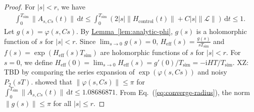 \documentclass[11pt]{article}
\newcommand{\eq}[1]{(\ref{eq:#1})}
\newcommand{\lem}[1]{\hyperref[lem:#1]{Lemma~\ref*{lem:#1}}}
\renewcommand{\i}{\mathrm{i}}
\renewcommand{\d}{\mathrm{d}}
\renewcommand{\L}{\mathcal{L}}
\newcommand{\simu}{\mathrm{sim}}
\newcommand{\Hc}{H_{\mathrm{control}}}
\newcommand{\He}{H_{\mathrm{eff}}}
\newcommand{\xz}[1]{{\color{cyan} XZ: #1}}
\begin{document}
\begin{proof}
    For $|s|< r$, we have \begin{align}
    \label{eq:converge-radius}
        \int_{0}^{T_{\simu}}\|A_{s,Cs}(t) \|\,\d t\le\int_{0}^{T_{\simu}}(2|s|\|\Hc(t)\|+C|s|\|\L\|)\, \d t\le 1.
    \end{align}
    Let $g(s) = \varphi(s, Cs)$. By \lem{analytic-phi}, $g(s)$ is a holomorphic function of $s$ for $|s|< r$. Since $\lim_{s\to 0}g(s)= 0$, 
    $\He(s)=\frac{g(s)}{sT_{\simu}}$ and $f(s) = \exp(\He(s)T_{\simu})$ are holomorphic functions of $s$ for $|s|< r$. For $s=0$, we define $\He(0) = \lim_{s\to 0} \He(s) = g'(0)/T_{\simu}= -\i HT/T_{\simu}$. \xz{TBD by comparing the series expansion of $\exp(\varphi(s, Cs))$ and noisy $P_2(sT)$.}
    \citet{moan1998efficient} showed that $\|\varphi(s,C s)\|\le \pi$ for  $ \int_{0}^{T_{\simu}}\|A_{s, Cs}(t) \|\,\d t\le 1.08686871$. From Eq.~\eq{converge-radius}, the norm $\|g(s)\|\le \pi $ for all $|s|\le r$. 


\end{proof}
\end{document}
